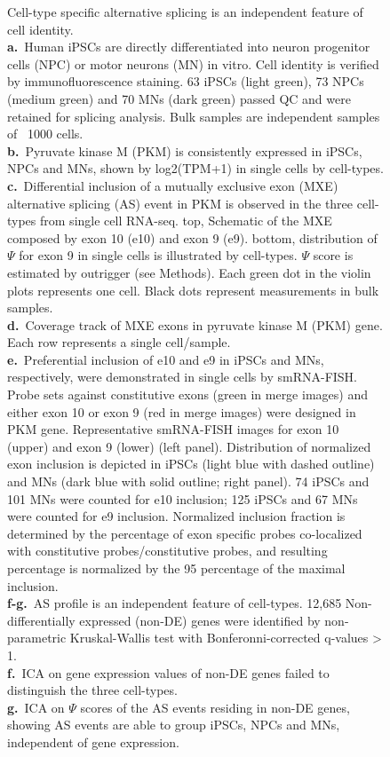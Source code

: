 \clearpage
\thispagestyle{facingcaption}
\begin{figure}[h]
\captionsetup{labelformat=prev-page}
\caption[Cell-type specific alternative splicing is an independent feature of cell identity.]{
Cell-type specific alternative splicing is an independent feature of cell identity.\\
\textbf{a.}~Human iPSCs are directly differentiated into neuron progenitor cells (NPC) or motor neurons (MN) in vitro. Cell identity is verified by immunofluorescence staining. 63 iPSCs (light green), 73 NPCs (medium green) and 70 MNs (dark green) passed QC and were retained for splicing analysis. Bulk samples are independent samples of ~1000 cells.\\
\textbf{b.}~Pyruvate kinase M (PKM) is consistently expressed in iPSCs, NPCs and MNs, shown by log2(TPM+1) in single cells by cell-types.\\
\textbf{c.}~Differential inclusion of a mutually exclusive exon (MXE) alternative splicing (AS) event in PKM is observed in the three cell-types from single cell RNA-seq. top, Schematic of the MXE composed by exon 10 (e10) and exon 9 (e9). bottom, distribution of $\Psi$ for exon 9 in single cells is illustrated by cell-types. $\Psi$ score is estimated by outrigger (see Methods). Each green dot in the violin plots represents one cell. Black dots represent measurements in bulk samples.\\
\textbf{d.}~Coverage track of MXE exons in pyruvate kinase M (PKM) gene. Each row represents a single cell/sample. \\
\textbf{e.}~Preferential inclusion of e10 and e9 in iPSCs and MNs, respectively, were demonstrated in single cells by smRNA-FISH. Probe sets against constitutive exons (green in merge images) and either exon 10 or exon 9 (red in merge images) were designed in PKM gene. Representative smRNA-FISH images for exon 10 (upper) and exon 9 (lower) (left panel). Distribution of normalized exon inclusion is depicted in iPSCs (light blue with dashed outline) and MNs (dark blue with solid outline; right panel). 74 iPSCs and 101 MNs were counted for e10 inclusion; 125 iPSCs and 67 MNs were counted for e9 inclusion. Normalized inclusion fraction is determined by the percentage of exon specific probes co-localized with constitutive probes/constitutive probes, and resulting percentage is normalized by the 95 percentage of the maximal inclusion.\\
\textbf{f-g.}~AS profile is an independent feature of cell-types. 12,685 Non-differentially expressed (non-DE) genes were identified by non-parametric Kruskal-Wallis test with Bonferonni-corrected q-values > 1. \\
\textbf{f.}~ICA on gene expression values of non-DE genes failed to distinguish the three cell-types. \\
\textbf{g.}~ICA on $\Psi$ scores of the AS events residing in non-DE genes, showing AS events are able to group iPSCs, NPCs and MNs, independent of gene expression.
}
\label{fig:system_overview}

\end{figure}
